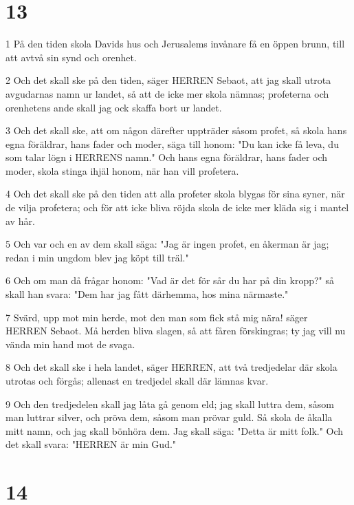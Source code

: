 \chapter{13}

\par 1 På den tiden skola Davids hus och Jerusalems invånare få en öppen brunn, till att avtvå sin synd och orenhet.
\par 2 Och det skall ske på den tiden, säger HERREN Sebaot, att jag skall utrota avgudarnas namn ur landet, så att de icke mer skola nämnas; profeterna och orenhetens ande skall jag ock skaffa bort ur landet.
\par 3 Och det skall ske, att om någon därefter uppträder såsom profet, så skola hans egna föräldrar, hans fader och moder, säga till honom: "Du kan icke få leva, du som talar lögn i HERRENS namn." Och hans egna föräldrar, hans fader och moder, skola stinga ihjäl honom, när han vill profetera.
\par 4 Och det skall ske på den tiden att alla profeter skola blygas för sina syner, när de vilja profetera; och för att icke bliva röjda skola de icke mer kläda sig i mantel av hår.
\par 5 Och var och en av dem skall säga: "Jag är ingen profet, en åkerman är jag; redan i min ungdom blev jag köpt till träl."
\par 6 Och om man då frågar honom: "Vad är det för sår du har på din kropp?" så skall han svara: "Dem har jag fått därhemma, hos mina närmaste."
\par 7 Svärd, upp mot min herde, mot den man som fick stå mig nära! säger HERREN Sebaot. Må herden bliva slagen, så att fåren förskingras; ty jag vill nu vända min hand mot de svaga.
\par 8 Och det skall ske i hela landet, säger HERREN, att två tredjedelar där skola utrotas och förgås; allenast en tredjedel skall där lämnas kvar.
\par 9 Och den tredjedelen skall jag låta gå genom eld; jag skall luttra dem, såsom man luttrar silver, och pröva dem, såsom man prövar guld. Så skola de åkalla mitt namn, och jag skall bönhöra dem. Jag skall säga: "Detta är mitt folk." Och det skall svara: "HERREN är min Gud."

\chapter{14}

